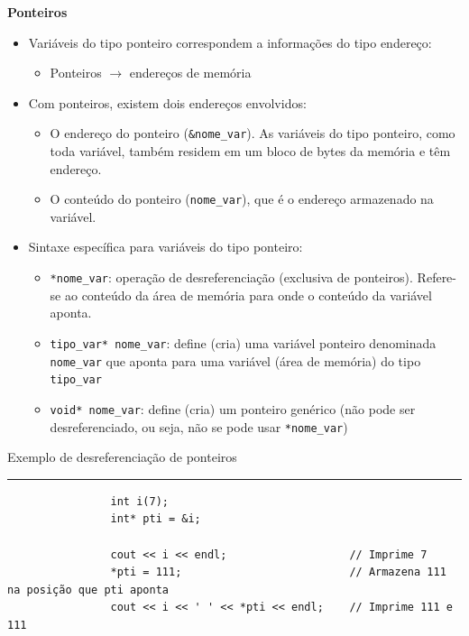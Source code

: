 \documentclass{article}
\begin{document}
	
	\begin{center}
		\LARGE \textbf{Ponteiros}
	\end{center}
	
	\vspace{1em}
	
	\begin{itemize}
		\item Variáveis do tipo ponteiro correspondem a informações do tipo endereço:
		\begin{itemize}
			\item Ponteiros $\rightarrow$ endereços de memória
		\end{itemize}
		
		\item Com ponteiros, existem dois endereços envolvidos:
		\begin{itemize}
			\item O endereço do ponteiro (\texttt{\&nome\_var}). As variáveis do tipo ponteiro, como toda variável, também residem em um bloco de bytes da memória e têm endereço.
			\item O conteúdo do ponteiro (\texttt{nome\_var}), que é o endereço armazenado na variável.
		\end{itemize}
		
		\item Sintaxe específica para variáveis do tipo ponteiro:
		\begin{itemize}
			\item \texttt{*nome\_var}: operação de desreferenciação (exclusiva de ponteiros). Refere-se ao conteúdo da área de memória para onde o conteúdo da variável aponta.
			\item \texttt{tipo\_var* nome\_var}: define (cria) uma variável ponteiro denominada \texttt{nome\_var} que aponta para uma variável (área de memória) do tipo \texttt{tipo\_var}
			\item \texttt{void* nome\_var}: define (cria) um ponteiro genérico (não pode ser desreferenciado, ou seja, não se pode usar \texttt{*nome\_var})
		\end{itemize}
	\end{itemize}
	
	\vspace{1.5em}
	
	\begin{lrbox}{\caixadecodigo}
		\begin{minipage}{\dimexpr\textwidth-2\fboxsep-2\fboxrule\relax}
			\begin{center}
				Exemplo de desreferenciação de ponteiros
			\end{center}
			\hrule
			\vspace{0.5em}
			\begin{verbatim}
				int i(7);
				int* pti = &i;
				
				cout << i << endl;                   // Imprime 7
				*pti = 111;                          // Armazena 111 na posição que pti aponta
				cout << i << ' ' << *pti << endl;    // Imprime 111 e 111
			\end{verbatim}
			\vspace{0.2em}
		\end{minipage}
	\end{lrbox}
	
\end{document}
